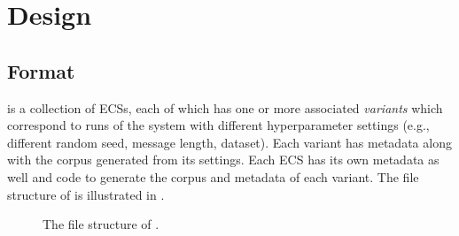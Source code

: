 \section{Design}
\unskip\label{elcc:sec:design}

\subsection{Format}
\unskip\label{elcc:sec:format}

\theLib{} is a collection of ECSs, each of which has one or more associated \emph{variants} which correspond to runs of the system with different hyperparameter settings (e.g., different random seed, message length, dataset).
Each variant has metadata along with the corpus generated from its settings.
Each ECS has its own metadata as well and code to generate the corpus and metadata of each variant.
The file structure of \theLib{} is illustrated in .

\begin{figure}
  \centering
  \small
  \caption{The file structure of \theLib{}.}
  \unskip\label{elcc:fig:structure}
\end{figure}


